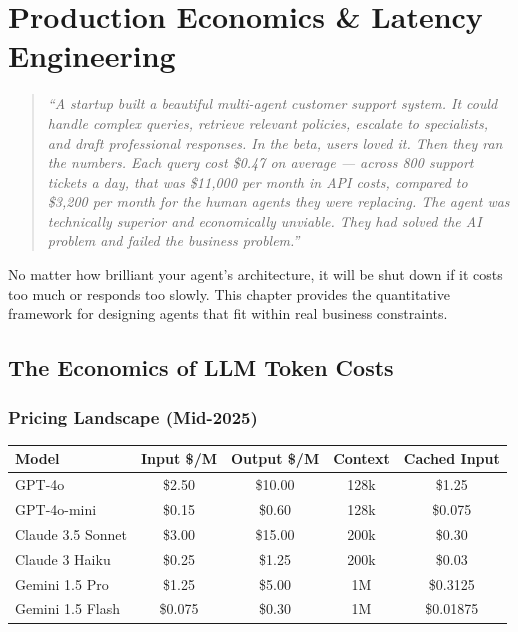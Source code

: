 \chapter{Production Economics \& Latency Engineering}

\begin{quote}
\textit{``A startup built a beautiful multi-agent customer support system. It could handle complex queries, retrieve relevant policies, escalate to specialists, and draft professional responses. In the beta, users loved it. Then they ran the numbers. Each query cost \$0.47 on average — across 800 support tickets a day, that was \$11,000 per month in API costs, compared to \$3,200 per month for the human agents they were replacing. The agent was technically superior and economically unviable. They had solved the AI problem and failed the business problem.''}
\end{quote}

No matter how brilliant your agent's architecture, it will be shut down if it costs too much or responds too slowly. This chapter provides the quantitative framework for designing agents that fit within real business constraints.

\section{The Economics of LLM Token Costs}

\subsection{Pricing Landscape (Mid-2025)}
\begin{center}
\begin{tabular}{|l|c|c|c|c|}
\hline
\textbf{Model} & \textbf{Input \$/M} & \textbf{Output \$/M} & \textbf{Context} & \textbf{Cached Input} \\
\hline
GPT-4o & \$2.50 & \$10.00 & 128k & \$1.25 \\
GPT-4o-mini & \$0.15 & \$0.60 & 128k & \$0.075 \\
Claude 3.5 Sonnet & \$3.00 & \$15.00 & 200k & \$0.30 \\
Claude 3 Haiku & \$0.25 & \$1.25 & 200k & \$0.03 \\
Gemini 1.5 Pro & \$1.25 & \$5.00 & 1M & \$0.3125 \\
Gemini 1.5 Flash & \$0.075 & \$0.30 & 1M & \$0.01875 \\
\hline
\end{tabular}
\end{center}

